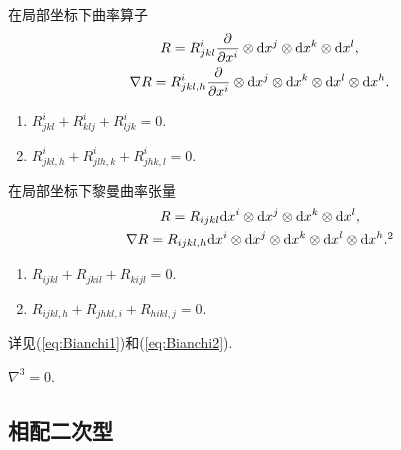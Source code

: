     \begin{proposition}[曲率算子在局部坐标表示下的Bianchi恒等式]\hfill\par
        在局部坐标下曲率算子
        \begin{gather*}
            R = R^{i}_{jkl}\frac{\partial }{\partial x^i}\otimes{\rm d}{x^j}\otimes{\rm d}{x^k}\otimes{\rm d}{x^l}, \\
            \nabla{R} = R^{i}_{jkl,h}\frac{\partial }{\partial x^i}\otimes{\rm d}{x^j}\otimes{\rm d}{x^k}\otimes{\rm d}{x^l}\otimes{\rm d}{x^h}.
        \end{gather*}
        \begin{enumerate}
            \item $R^{i}_{jkl} + R^{i}_{klj} + R^{i}_{ljk} = 0$.
            \item $R^{i}_{jkl,h} + R^{i}_{jlh,k} + R^{i}_{jhk,l} = 0$.
        \end{enumerate}
    \end{proposition}

    \begin{proposition}[黎曼曲率张量在局部坐标表示下的Bianchi恒等式]\hfill\par
        在局部坐标下黎曼曲率张量
        \begin{gather*}
            R = R_{ijkl}\md{x^i}\otimes\md{x^j}\otimes\md{x^k}\otimes\md{x^l}, \\
            \nabla{R} = R_{ijkl,h}\md{x^i}\otimes\md{x^j}\otimes\md{x^k}\otimes\md{x^l}\otimes\md{x^h}.\footnotemark[2]
        \end{gather*}
        \begin{enumerate}
            \item $R_{ijkl}+R_{jkil}+R_{kijl}=0$.
            \item $R_{ijkl,h}+R_{jhkl,i}+R_{hikl,j}=0$.\footnotemark[3]
        \end{enumerate}
    \end{proposition}

    \begin{proposition}[曲率形式的Bianchi恒等式]
        详见{\rm(\ref{eq:Bianchi1})}和{\rm(\ref{eq:Bianchi2})}.
    \end{proposition}

    \begin{proposition}[一般向量丛上联络的Bianchi恒等式]
        $\nabla^3=0$.
    \end{proposition}
    
\subsection{相配二次型}

